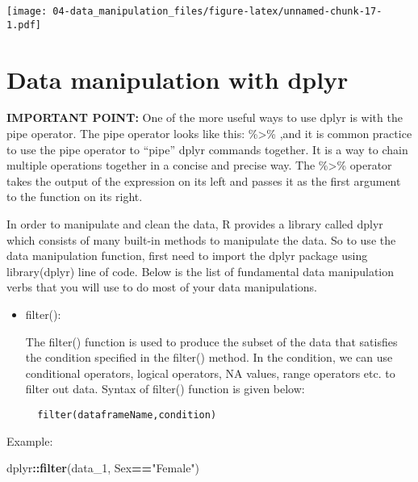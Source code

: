 \documentclass[
]{book}
\newenvironment{Shaded}{\begin{snugshade}}{\end{snugshade}}
\newcommand{\AttributeTok}[1]{\textcolor[rgb]{0.13,0.29,0.53}{#1}}
\newcommand{\FunctionTok}[1]{\textcolor[rgb]{0.13,0.29,0.53}{\textbf{#1}}}
\newcommand{\NormalTok}[1]{#1}
\newcommand{\SpecialCharTok}[1]{\textcolor[rgb]{0.81,0.36,0.00}{\textbf{#1}}}
\newcommand{\StringTok}[1]{\textcolor[rgb]{0.31,0.60,0.02}{#1}}
\begin{document}
\begin{Shaded}
\end{Shaded}

\texttt{[image: 04-data\_manipulation\_files/figure-latex/unnamed-chunk-17-1.pdf]}

\hypertarget{data-manipulation-with-dplyr}{%
\section{Data manipulation with dplyr}\label{data-manipulation-with-dplyr}}

\textbf{IMPORTANT POINT:}
One of the more useful ways to use dplyr is with the pipe operator. The pipe operator looks like this: \%\textgreater\% ,and it is common practice to use the pipe operator to ``pipe'' dplyr commands together. It is a way to chain multiple operations together in a concise and precise way. The \%\textgreater\% operator takes the output of the expression on its left and passes it as the first argument to the function on its right.

In order to manipulate and clean the data, R provides a library called dplyr which consists of many built-in methods to manipulate the data. So to use the data manipulation function, first need to import the dplyr package using library(dplyr) line of code. Below is the list of fundamental data manipulation verbs that you will use to do most of your data manipulations.

\begin{itemize}
\item
  filter():

  The filter() function is used to produce the subset of the data that satisfies the condition specified in the filter() method. In the condition, we can use conditional operators, logical operators, NA values, range operators etc. to filter out data. Syntax of filter() function is given below:

\begin{verbatim}
  filter(dataframeName,condition)
\end{verbatim}
\end{itemize}

Example:

\begin{Shaded}
\begin{Highlighting}[]
\NormalTok{dplyr}\SpecialCharTok{::}\FunctionTok{filter}\NormalTok{(data\_1, Sex}\SpecialCharTok{==}\StringTok{"Female"}\NormalTok{)}
\end{Highlighting}
\end{Shaded}
\end{document}
